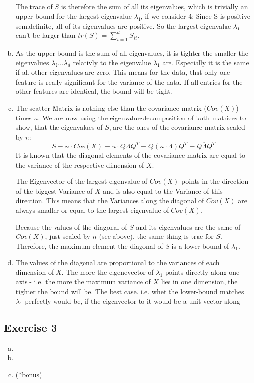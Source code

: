 \documentclass[10pt,a4paper]{article}
\begin{document}
\begin{enumerate}[(a)]
\begin{align*}
\end{align*}
The trace of $S$ is therefore the sum of all its eigenvalues, which is trivially an upper-bound for the largest eigenvalue $\lambda_1$, if we consider 4: Since S is positive semidefinite, all of its eigenvalues are positive. So the largest eigenvalue $\lambda_1$ can't be larger than $tr(S) = \sum^d_{i=1} S_{ii}$.
\item As the upper bound is the sum of all eigenvalues, it is tighter the smaller the eigenvalues $\lambda_2 \dots \lambda_d$ relativly to the eigenvalue $\lambda_1$ are. Especially it is the same if all other eigenvalues are zero. This means for the data, that only one feature is really significant for the variance of the data. If all entries for the other features are identical, the bound will be tight.
\item
The scatter Matrix is nothing else than the covariance-matrix ($Cov(X)$) times $n$. We are now using the eigenvalue-decomposition of both matrices to show, that the eigenvalues of $S$, are the ones of the covariance-matrix scaled by $n$:
$$S = n \cdot Cov(X) = n \cdot Q\Lambda Q^T = Q(n \cdot \Lambda)Q^T = Q\overline{\Lambda}Q^T$$
It is known that the diagonal-elements of the covariance-matrix are equal to the variance of the respective dimension of $X$.

The Eigenvector of the largest eigenvalue of $Cov(X)$ points in the direction of the biggest Variance of $X$ and is also equal to the Variance of this direction. This means that the Variances along the diagonal of $Cov(X)$ are always smaller or equal to the largest eigenvalue of $Cov(X)$.

Because the values of the diagonal of $S$ and its eigenvalues are the same of $Cov(X)$, just scaled by $n$ (see above), the same thing is true for $S$. Therefore, the maximum element the diagonal of $S$ is a lower bound of $\lambda_1$.
\item
The values of the diagonal are proportional to the variances of each dimension of $X$. The more the eigenevector of $\lambda_1$ points directly along one axis - i.e. the more the maximum variance of $X$ lies in one dimension, the tighter the bound will be.
The best case, i.e. whet the lower-bound matches $\lambda_1$ perfectly would be, if the eigenvector to it would be a unit-vector along 
\end{enumerate}
\subsection*{Exercise 3}
\begin{enumerate}[(a)]
\item
\item
\item (*bonus)
\end{enumerate}
\end{document}
